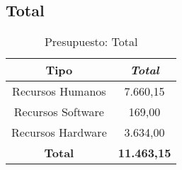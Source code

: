 \subsection{Total}

\begin{table}[htp]
	\centering
	\caption{Presupuesto: Total}\label{tab:total-budget}
	\begin{tabular}{cc}
		\toprule
    	\textbf{Tipo} 		& 	\emph{Total}\\
    	\midrule
    	Recursos Humanos	& 			7.660,15\\
		Recursos Software	&			169,00\\
		Recursos Hardware	&			3.634,00\\
		\textbf{Total}		&	\textbf{11.463,15}\\
    	\bottomrule
    \end{tabular}
\end{table}